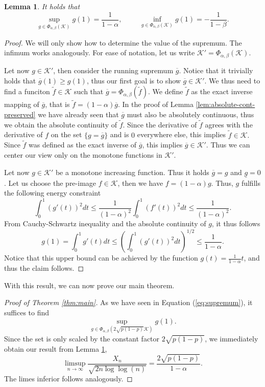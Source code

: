 \documentclass[11pt]{article}
\newtheorem{lemma}{Lemma}[section]
\theoremstyle{remark}
\begin{document}
\begin{lemma}\label{lem:variation-calculus}
    It holds that
    $$\sup_{g\in\Phi_{\alpha,\beta}(\mathcal{K})}g(1)=\frac{1}{1-\alpha},\hspace{1cm}\inf_{g\in\Phi_{\alpha,\beta}(\mathcal{K})}g(1)=-\frac{1}{1-\beta}.$$
\end{lemma}
\begin{proof}
    We will only show how to determine the value of the supremum. The infimum works analogously. For ease of notation, let us write  $\mathcal{K}'=\Phi_{\alpha,\beta}(\mathcal{K}).$

    Let now $g\in\mathcal{K}'$, then consider the running supremum $\overline{g}$. Notice that it trivially holds that $\overline{g}(1)\geq g(1)$, thus our first goal is to show $\overline{g}\in\mathcal{K}'.$ We thus need to find a funciton $\tilde{f}\in\mathcal{K}$ such that $\overline{g}=\Phi_{\alpha,\beta}(\tilde{f})$. We define $\tilde{f}$ as the exact inverse mapping of $\overline{g}$, that is
    $\tilde{f}=(1-\alpha)\overline{g}.$
    In the proof of Lemma \ref{lem:absolute-cont-preserved} we have already seen that $\overline{g}$ must also be absolutely continuous, thus we obtain the absolute continuity of $\tilde{f}$. Since the derivative of $\tilde{f}$ agrees with the derivative of $f$ on the set $\{g=\overline{g}\}$ and is $0$ everywhere else, this implies $\tilde{f}\in\mathcal{K}.$ Since $\tilde{f}$ was defined as the exact inverse of $\overline{g}$, this implies $\overline{g}\in\mathcal{K}'$. Thus we can center our view only on the monotone functions in $\mathcal{K}'$.

    Let now $g\in\mathcal{K}'$ be a monotone increasing function. Thus it holds $\overline{g}=g$ and $\underline{g}=0$. Let us choose the pre-image $f\in\mathcal{K}$, then we have
    $f=(1-\alpha)g.$
    Thus, $g$ fulfills the following energy constraint
    $$\int_0^1(g'(t))^2dt\leq \frac{1}{(1-\alpha)^2}\int_0^1(f'(t))^2dt\leq \frac{1}{(1-\alpha)^2}.$$
    From Cauchy-Schwartz inequality and the absolute continuity of $g$, it thus follows
    $$g(1)=\int_0^1g'(t)dt\leq\left(\int_0^1(g'(t))^2dt\right)^{1/2}\leq\frac{1}{1-\alpha}.$$
    Notice that this upper bound can be achieved by the function $g(t)=\frac{1}{1-\alpha}t$, and thus the claim follows.
\end{proof}
With this result, we can now prove our main theorem.
\begin{proof}[Proof of Theorem \ref{thm:main}]
    As we have seen in Equation (\ref{eq:supremum}), it suffices to find
    $$\sup_{g\in\Phi_{\alpha,\beta}(2\sqrt{p(1-p)}\mathcal{K})}g(1).$$
    Since the set is only scaled by the constant factor $2\sqrt{p(1-p)}$, we immediately obtain our result from Lemma \ref{lem:variation-calculus},
    $$\limsup_{n\rightarrow\infty}\frac{X_n}{\sqrt{2n\log\log(n)}}=\frac{2\sqrt{p(1-p)}}{1-\alpha}.$$
    The limes inferior follows analogously.
\end{proof}
\end{document}
